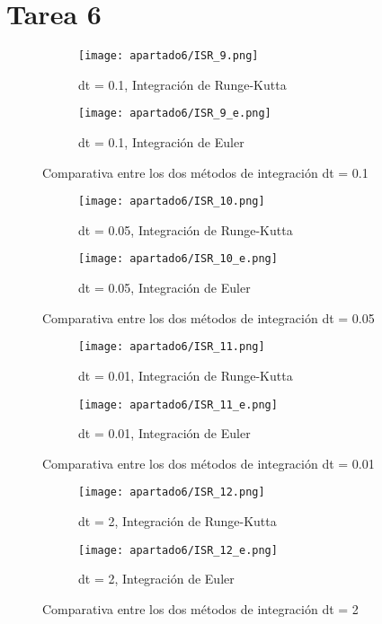 \section{Tarea 6}
\begin{figure}[H]
	\centering
	\begin{subfigure}[b]{0.8\textwidth}
		\centering
		\texttt{[image: apartado6/ISR\_9.png]}
		\caption{dt = 0.1, Integración de Runge-Kutta}
	\end{subfigure}
	\hfill
	\begin{subfigure}[b]{0.8\textwidth}
		\centering
		\texttt{[image: apartado6/ISR\_9\_e.png]}
		\caption{dt = 0.1, Integración de Euler}
	\end{subfigure}
	\caption{Comparativa entre los dos métodos de integración dt = 0.1}
\end{figure}
\begin{figure}[H]
	\centering
	\begin{subfigure}[b]{0.8\textwidth}
		\centering
		\texttt{[image: apartado6/ISR\_10.png]}
		\caption{dt = 0.05, Integración de Runge-Kutta}
	\end{subfigure}
	\hfill
	\begin{subfigure}[b]{0.8\textwidth}
		\centering
		\texttt{[image: apartado6/ISR\_10\_e.png]}
		\caption{dt = 0.05, Integración de Euler}
	\end{subfigure}
	\caption{Comparativa entre los dos métodos de integración dt = 0.05}
\end{figure}
\begin{figure}[H]
	\centering
	\begin{subfigure}[b]{0.8\textwidth}
		\centering
		\texttt{[image: apartado6/ISR\_11.png]}
		\caption{dt = 0.01, Integración de Runge-Kutta}
	\end{subfigure}
	\hfill
	\begin{subfigure}[b]{0.8\textwidth}
		\centering
		\texttt{[image: apartado6/ISR\_11\_e.png]}
		\caption{dt = 0.01, Integración de Euler}
	\end{subfigure}
	\caption{Comparativa entre los dos métodos de integración dt = 0.01}
\end{figure}
\begin{figure}[H]
	\centering
	\begin{subfigure}[b]{0.8\textwidth}
		\centering
		\texttt{[image: apartado6/ISR\_12.png]}
		\caption{dt = 2, Integración de Runge-Kutta}
	\end{subfigure}
	\hfill
	\begin{subfigure}[b]{0.8\textwidth}
		\centering
		\texttt{[image: apartado6/ISR\_12\_e.png]}
		\caption{dt = 2, Integración de Euler}
	\end{subfigure}
	\caption{Comparativa entre los dos métodos de integración dt = 2}
\end{figure}
